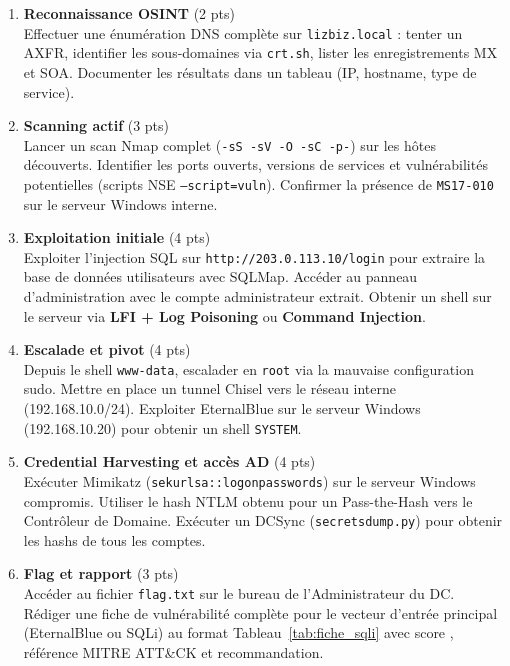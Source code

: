 \begin{enumerate}
    \item \textbf{Reconnaissance OSINT} (2 pts) \\
          Effectuer une énumération DNS complète sur \texttt{lizbiz.local} :
          tenter un AXFR, identifier les sous-domaines via \texttt{crt.sh},
          lister les enregistrements MX et SOA. Documenter les résultats
          dans un tableau (IP, hostname, type de service).

    \item \textbf{Scanning actif} (3 pts) \\
          Lancer un scan Nmap complet (\texttt{-sS -sV -O -sC -p-}) sur
          les hôtes découverts. Identifier les ports ouverts, versions
          de services et vulnérabilités potentielles (scripts NSE
          \texttt{--script=vuln}). Confirmer la présence de
          \texttt{MS17-010} sur le serveur Windows interne.

    \item \textbf{Exploitation initiale} (4 pts) \\
          Exploiter l'injection SQL sur \texttt{http://203.0.113.10/login}
          pour extraire la base de données utilisateurs avec SQLMap.
          Accéder au panneau d'administration avec le compte administrateur
          extrait. Obtenir un shell sur le serveur via \textbf{LFI + Log
          Poisoning} ou \textbf{Command Injection}.

    \item \textbf{Escalade et pivot} (4 pts) \\
          Depuis le shell \texttt{www-data}, escalader en \texttt{root} via
          la mauvaise configuration sudo. Mettre en place un tunnel Chisel
          vers le réseau interne (192.168.10.0/24). Exploiter EternalBlue
          sur le serveur Windows (192.168.10.20) pour obtenir un shell
          \texttt{SYSTEM}.

    \item \textbf{Credential Harvesting et accès AD} (4 pts) \\
          Exécuter Mimikatz (\texttt{sekurlsa::logonpasswords}) sur le
          serveur Windows compromis. Utiliser le hash NTLM obtenu pour
          un Pass-the-Hash vers le Contrôleur de Domaine.
          Exécuter un DCSync (\texttt{secretsdump.py}) pour obtenir les
          hashs de tous les comptes.

    \item \textbf{Flag et rapport} (3 pts) \\
          Accéder au fichier \texttt{flag.txt} sur le bureau de
          l'Administrateur du DC. Rédiger une fiche de vulnérabilité
          complète pour le vecteur d'entrée principal (EternalBlue ou SQLi)
          au format Tableau~\ref{tab:fiche_sqli} avec score , référence MITRE ATT\&CK et recommandation.
\end{enumerate}

